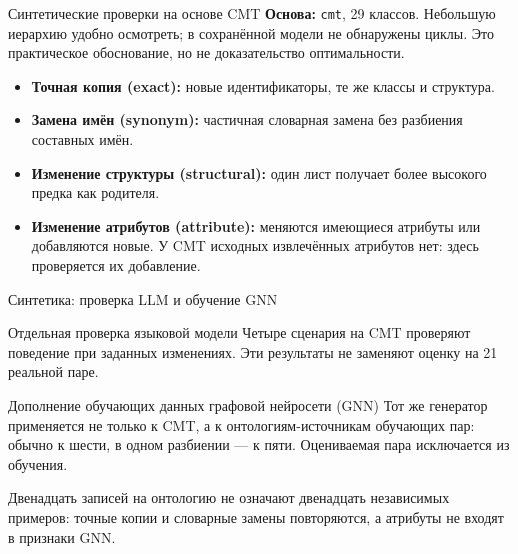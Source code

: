 \documentclass[aspectratio=169,11pt]{beamer}
\begin{document}
\renewcommand{\hseheadertext}{Дополнительные материалы}
\begin{frame}{Синтетические проверки на основе CMT}
  \textbf{Основа:} \texttt{cmt}, 29 классов. Небольшую иерархию удобно осмотреть;
  в сохранённой модели не обнаружены циклы. Это практическое обоснование, но не доказательство оптимальности.
  \begin{itemize}
    \item \textbf{Точная копия (exact):} новые идентификаторы, те же классы и структура.
    \item \textbf{Замена имён (synonym):} частичная словарная замена без разбиения составных имён.
    \item \textbf{Изменение структуры (structural):} один лист получает более высокого предка как родителя.
    \item \textbf{Изменение атрибутов (attribute):} меняются имеющиеся атрибуты или добавляются новые.
      У CMT исходных извлечённых атрибутов нет: здесь проверяется их добавление.
  \end{itemize}
\end{frame}

\renewcommand{\hseheadertext}{Дополнительные материалы}
\begin{frame}{Синтетика: проверка LLM и обучение GNN}
  \begin{block}{Отдельная проверка языковой модели}
    Четыре сценария на CMT проверяют поведение при заданных изменениях.
    Эти результаты не заменяют оценку на 21 реальной паре.
  \end{block}
  \begin{block}{Дополнение обучающих данных графовой нейросети (GNN)}
    Тот же генератор применяется не только к CMT, а к онтологиям-источникам обучающих пар:
    обычно к шести, в одном разбиении --- к пяти. Оцениваемая пара исключается из обучения.
  \end{block}
  \alert{Двенадцать записей на онтологию не означают двенадцать независимых примеров:
    точные копии и словарные замены повторяются, а атрибуты не входят в признаки GNN.}
\end{frame}
\end{document}
